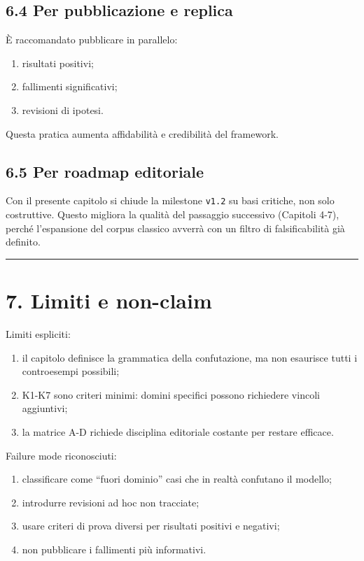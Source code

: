 \subsection{6.4 Per pubblicazione e replica}

È raccomandato pubblicare in parallelo:

\begin{enumerate}
\def\labelenumi{\arabic{enumi}.}
\tightlist
\item
  risultati positivi;
\item
  fallimenti significativi;
\item
  revisioni di ipotesi.
\end{enumerate}

Questa pratica aumenta affidabilità e credibilità del framework.

\subsection{6.5 Per roadmap editoriale}

Con il presente capitolo si chiude la milestone \texttt{v1.2} su basi critiche, non solo costruttive. Questo migliora la qualità del passaggio successivo (Capitoli 4-7), perché l'espansione del corpus classico avverrà con un filtro di falsificabilità già definito.

\begin{center}\rule{0.5\linewidth}{0.5pt}\end{center}

\section{7. Limiti e non-claim}

Limiti espliciti:

\begin{enumerate}
\def\labelenumi{\arabic{enumi}.}
\tightlist
\item
  il capitolo definisce la grammatica della confutazione, ma non esaurisce tutti i controesempi possibili;
\item
  K1-K7 sono criteri minimi: domini specifici possono richiedere vincoli aggiuntivi;
\item
  la matrice A-D richiede disciplina editoriale costante per restare efficace.
\end{enumerate}

Failure mode riconosciuti:

\begin{enumerate}
\def\labelenumi{\arabic{enumi}.}
\tightlist
\item
  classificare come ``fuori dominio'' casi che in realtà confutano il modello;
\item
  introdurre revisioni ad hoc non tracciate;
\item
  usare criteri di prova diversi per risultati positivi e negativi;
\item
  non pubblicare i fallimenti più informativi.
\end{enumerate}


